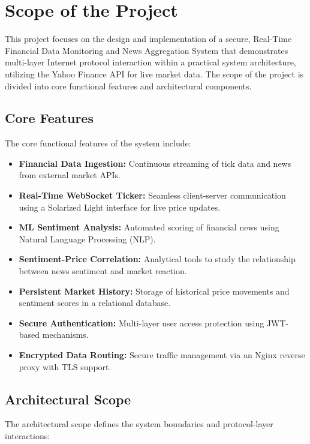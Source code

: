 \section{Scope of the Project}


This project focuses on the design and implementation of a secure, Real-Time Financial Data Monitoring and News Aggregation System that demonstrates multi-layer Internet protocol interaction within a practical system architecture, utilizing the Yahoo Finance API for live market data. The scope of the project is divided into core functional features and architectural components.

\subsection{Core Features}

The core functional features of the system include:

\begin{itemize}
    \item \textbf{Financial Data Ingestion:} Continuous streaming of tick data and news from external market APIs.
    \item \textbf{Real-Time WebSocket Ticker:} Seamless client-server communication using a Solarized Light interface for live price updates.
    \item \textbf{ML Sentiment Analysis:} Automated scoring of financial news using Natural Language Processing (NLP).
    \item \textbf{Sentiment-Price Correlation:} Analytical tools to study the relationship between news sentiment and market reaction.
    \item \textbf{Persistent Market History:} Storage of historical price movements and sentiment scores in a relational database.
    \item \textbf{Secure Authentication:} Multi-layer user access protection using JWT-based mechanisms.
    \item \textbf{Encrypted Data Routing:} Secure traffic management via an Nginx reverse proxy with TLS support.
\end{itemize}

\subsection{Architectural Scope}

The architectural scope defines the system boundaries and protocol-layer interactions:

